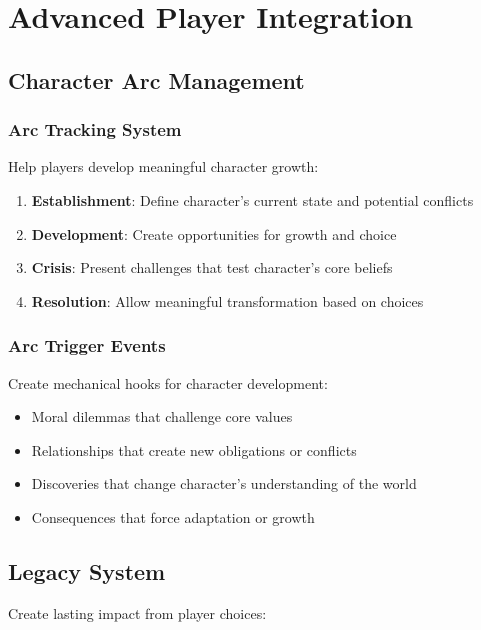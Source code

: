 \documentclass[11pt]{article}
\begin{document}
\section{Advanced Player Integration}

\subsection{Character Arc Management}

\subsubsection{Arc Tracking System}

Help players develop meaningful character growth:

\begin{enumerate}
  \item \textbf{Establishment}: Define character's current state and potential conflicts
  \item \textbf{Development}: Create opportunities for growth and choice
  \item \textbf{Crisis}: Present challenges that test character's core beliefs
  \item \textbf{Resolution}: Allow meaningful transformation based on choices
\end{enumerate}

\subsubsection{Arc Trigger Events}

Create mechanical hooks for character development:

\begin{itemize}
  \item Moral dilemmas that challenge core values
  \item Relationships that create new obligations or conflicts
  \item Discoveries that change character's understanding of the world
  \item Consequences that force adaptation or growth
\end{itemize}

\subsection{Legacy System}

Create lasting impact from player choices:
\end{document}
